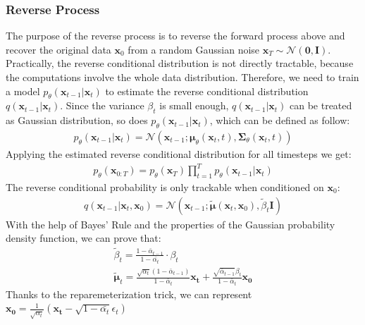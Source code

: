 \documentclass[12pt,DIV14,BCOR12mm,a4paper,footinclude=false,headinclude,parskip=half-,twoside,openright,cleardoublepage=empty,toc=index,bibliography=totoc,listof=totoc]{scrreprt}
\numberwithin{equation}{chapter}
\begin{document}
\subsubsection{Reverse Process}\label{sec:reverse}
The purpose of the reverse process is to reverse the forward process above and recover the original data $\mathbf{x}_{0}$ from a random Gaussian noise $\mathbf{x}_{T} \sim \mathcal{N}(\mathbf{0}, \mathbf{I})$. Practically, the reverse conditional distribution is not directly tractable, because the computations involve the whole data distribution. Therefore, we need to train a model $p_{\theta}(\mathbf{x}_{t-1}|\mathbf{x}_{t})$ to estimate the reverse conditional distribution $q(\mathbf{x}_{t-1}|\mathbf{x}_{t})$. Since the variance $\beta_{t}$ is small enough, $q(\mathbf{x}_{t-1}|\mathbf{x}_{t})$ can be treated as Gaussian distribution, so does $p_{\theta}(\mathbf{x}_{t-1}|\mathbf{x}_{t})$, which can be defined as follow:
\begin{align}\label{eq:reverse}
  p_{\theta}(\mathbf{x}_{t-1}|\mathbf{x}_{t}) = \mathcal{N}(\mathbf{x}_{t-1}; \boldsymbol{\mu}_{\theta}(\mathbf{x}_{t},t), \mathbf{\Sigma}_{\theta}(\mathbf{x}_{t},t))
\end{align}
Applying the estimated reverse conditional distribution for all timesteps we get:
\begin{align}\label{eq:reverse_all}
  p_{\theta}(\mathbf{x}_{0:T}) = p_{\theta}(\mathbf{x}_{T})\prod_{t=1}^{T}p_{\theta}(\mathbf{x}_{t-1}|\mathbf{x}_{t})
\end{align}
The reverse conditional probability is only trackable when conditioned on $\mathbf{x}_{0}$:
\begin{align}\label{eq:reverse_q}
  q(\mathbf{x}_{t-1}|\mathbf{x}_{t},\mathbf{x}_{0}) = \mathcal{N} (\mathbf{x}_{t-1}; \boldsymbol{\tilde{\mu}}(\mathbf{x}_{t}, \mathbf{x}_{0}), \tilde{\beta}_{t}\mathbf{I})
\end{align}
With the help of Bayes' Rule and the properties of the Gaussian probability density function, we can prove that:
\begin{gather}
  \tilde{\beta}_{t} = \frac{1-\bar{\alpha}_{t-1}}{1-\bar{\alpha_{t}}} \cdot  \beta_{t}\\
  \boldsymbol{\tilde{\mu}}_{t} = \frac{\sqrt{\alpha_{t}}(1-\bar{\alpha}_{t-1})}{1-\bar{\alpha}_{t}}\mathbf{x_{t}} + \frac{\sqrt{\bar{\alpha}_{t-1}}\beta_{t}}{1-\bar{\alpha}_{t}}\mathbf{x_{0}}
\end{gather}
Thanks to the reparemeterization trick, we can represent $\mathbf{x_{0}} = \frac{1}{\sqrt{\alpha_{t}}}(\mathbf{x_{t}} - \sqrt{1-\bar{\alpha_{t}}}\epsilon_{t})$ 
\end{document}
